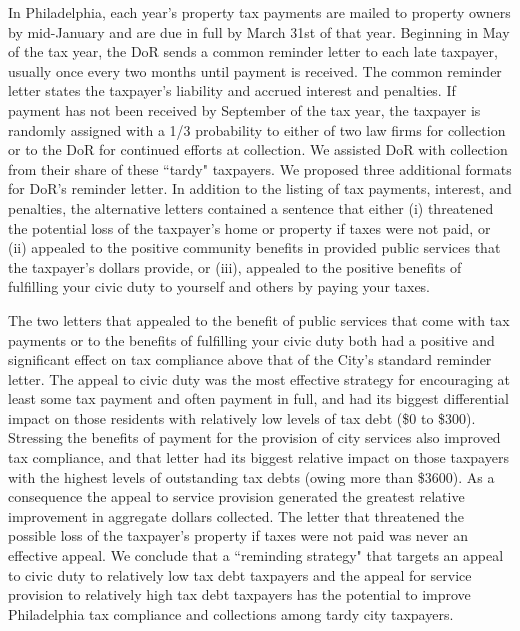 \documentclass[12pt,titlepage]{article}
\begin{document}
In Philadelphia, each year's property tax payments are mailed to
property owners by mid-January and are due in full by March 31st of
that year.  Beginning in May of the tax year, the DoR sends a common
reminder letter to each late taxpayer, usually once every two months
until payment is received.  The common reminder letter states the
taxpayer's liability and accrued interest and penalties.  If payment
has not been received by September of the tax year, the taxpayer is
randomly assigned with a 1/3 probability to either of two law firms
for collection or to the DoR for continued efforts at collection.  We
assisted DoR with collection from their share of these ``tardy"
taxpayers.  We proposed three additional formats for DoR's reminder
letter.  In addition to the listing of tax payments, interest, and
penalties, the alternative letters contained a sentence that either
(i) threatened the potential loss of the taxpayer's home or property
if taxes were not paid, or (ii) appealed to the positive community
benefits in provided public services that the taxpayer's dollars
provide, or (iii), appealed to the positive benefits of fulfilling
your civic duty to yourself and others by paying your taxes.

The two letters that appealed to the benefit of public services that
come with tax payments or to the benefits of fulfilling your civic
duty both had a positive and significant effect on tax compliance
above that of the City's standard reminder letter.  The appeal to
civic duty was the most effective strategy for encouraging at least
some tax payment and often payment in full, and had its biggest
differential impact on those residents with relatively low levels of
tax debt (\$0 to \$300).  Stressing the benefits of payment for the
provision of city services also improved tax compliance, and that
letter had its biggest relative impact on those taxpayers with the
highest levels of outstanding tax debts (owing more than \$3600).  As
a consequence the appeal to service provision generated the greatest
relative improvement in aggregate dollars collected.  The letter that
threatened the possible loss of the taxpayer's property if taxes were
not paid was never an effective appeal.  We conclude that a
``reminding strategy" that targets an appeal to civic duty to
relatively low tax debt taxpayers and the appeal for service provision
to relatively high tax debt taxpayers has the potential to improve
Philadelphia tax compliance and collections among tardy city
taxpayers.
\end{document}
